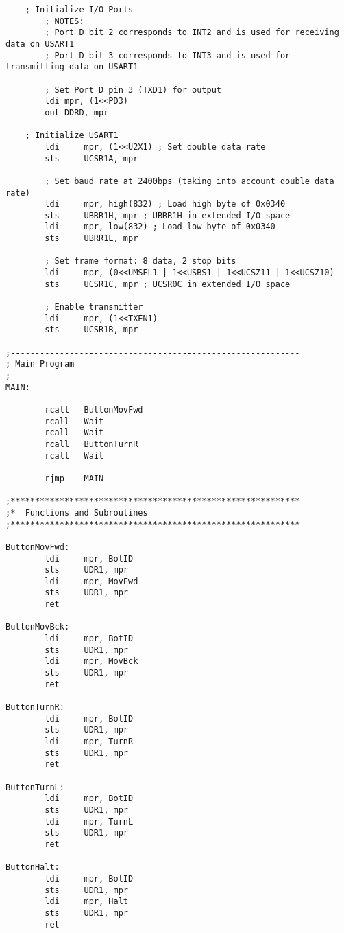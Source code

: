\documentclass[12pt,letterpaper]{article}
\begin{document}
\begin{verbatim}
    ; Initialize I/O Ports
        ; NOTES:
        ; Port D bit 2 corresponds to INT2 and is used for receiving data on USART1
        ; Port D bit 3 corresponds to INT3 and is used for transmitting data on USART1

        ; Set Port D pin 3 (TXD1) for output
        ldi mpr, (1<<PD3)
        out DDRD, mpr

    ; Initialize USART1
        ldi     mpr, (1<<U2X1) ; Set double data rate
        sts     UCSR1A, mpr

        ; Set baud rate at 2400bps (taking into account double data rate)
        ldi     mpr, high(832) ; Load high byte of 0x0340
        sts     UBRR1H, mpr ; UBRR1H in extended I/O space
        ldi     mpr, low(832) ; Load low byte of 0x0340
        sts     UBRR1L, mpr

        ; Set frame format: 8 data, 2 stop bits
        ldi     mpr, (0<<UMSEL1 | 1<<USBS1 | 1<<UCSZ11 | 1<<UCSZ10)
        sts     UCSR1C, mpr ; UCSR0C in extended I/O space

        ; Enable transmitter
        ldi     mpr, (1<<TXEN1)
        sts     UCSR1B, mpr

;-----------------------------------------------------------
; Main Program
;-----------------------------------------------------------
MAIN:

        rcall   ButtonMovFwd
        rcall   Wait
        rcall   Wait
        rcall   ButtonTurnR
        rcall   Wait

        rjmp    MAIN

;***********************************************************
;*  Functions and Subroutines
;***********************************************************

ButtonMovFwd:
        ldi     mpr, BotID
        sts     UDR1, mpr
        ldi     mpr, MovFwd
        sts     UDR1, mpr
        ret

ButtonMovBck:
        ldi     mpr, BotID
        sts     UDR1, mpr
        ldi     mpr, MovBck
        sts     UDR1, mpr
        ret

ButtonTurnR:
        ldi     mpr, BotID
        sts     UDR1, mpr
        ldi     mpr, TurnR
        sts     UDR1, mpr
        ret

ButtonTurnL:
        ldi     mpr, BotID
        sts     UDR1, mpr
        ldi     mpr, TurnL
        sts     UDR1, mpr
        ret

ButtonHalt:
        ldi     mpr, BotID
        sts     UDR1, mpr
        ldi     mpr, Halt
        sts     UDR1, mpr
        ret


\end{verbatim}
\end{document}
